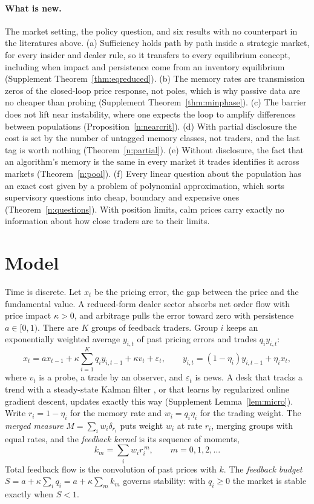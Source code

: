 \documentclass[12pt]{article}
\theoremstyle{definition}
\theoremstyle{remark}
\begin{document}
\paragraph{What is new.} The market setting, the policy question, and six results with no counterpart in the literatures above. (a) Sufficiency holds path by path inside a strategic market, for every insider and dealer rule, so it transfers to every equilibrium concept, including when impact and persistence come from an inventory equilibrium (Supplement Theorem~\ref{thm:eqreduced}). (b) The memory rates are transmission zeros of the closed-loop price response, not poles, which is why passive data are no cheaper than probing (Supplement Theorem~\ref{thm:minphase}). (c) The barrier does not lift near instability, where one expects the loop to amplify differences between populations (Proposition~\ref{n:nearcrit}). (d) With partial disclosure the cost is set by the number of untagged memory classes, not traders, and the last tag is worth nothing (Theorem~\ref{n:partial}). (e) Without disclosure, the fact that an algorithm's memory is the same in every market it trades identifies it across markets (Theorem~\ref{n:pool}). (f) Every linear question about the population has an exact cost given by a problem of polynomial approximation, which sorts supervisory questions into cheap, boundary and expensive ones (Theorem~\ref{n:questions}). With position limits, calm prices carry exactly no information about how close traders are to their limits.

\section{Model}\label{n:model}

Time is discrete. Let $x_t$ be the pricing error, the gap between the price and the fundamental value. A reduced-form dealer sector absorbs net order flow with price impact $\kappa>0$, and arbitrage pulls the error toward zero with persistence $a\in[0,1)$. There are $K$ groups of feedback traders. Group $i$ keeps an exponentially weighted average $y_{i,t}$ of past pricing errors and trades $q_iy_{i,t}$:
\begin{equation}\label{n:eq:model}
x_t=ax_{t-1}+\kappa\sum_{i=1}^Kq_iy_{i,t-1}+\kappa v_t+\varepsilon_t,\qquad y_{i,t}=(1-\eta_i)y_{i,t-1}+\eta_ix_t,
\end{equation}
where $v_t$ is a probe, a trade by an observer, and $\varepsilon_t$ is news. A desk that tracks a trend with a steady-state Kalman filter \citep{muth1960}, or that learns by regularized online gradient descent, updates exactly this way (Supplement Lemma~\ref{lem:micro}). Write $r_i=1-\eta_i$ for the memory rate and $w_i=q_i\eta_i$ for the trading weight. The \emph{merged measure} $M=\sum_iw_i\delta_{r_i}$ puts weight $w_i$ at rate $r_i$, merging groups with equal rates, and the \emph{feedback kernel} is its sequence of moments,
\[
k_m=\sum_iw_ir_i^{\,m},\qquad m=0,1,2,\ldots
\]
Total feedback flow is the convolution of past prices with $k$. The \emph{feedback budget} $S=a+\kappa\sum_iq_i=a+\kappa\sum_mk_m$ governs stability: with $q_i\ge0$ the market is stable exactly when $S<1$.
\end{document}
